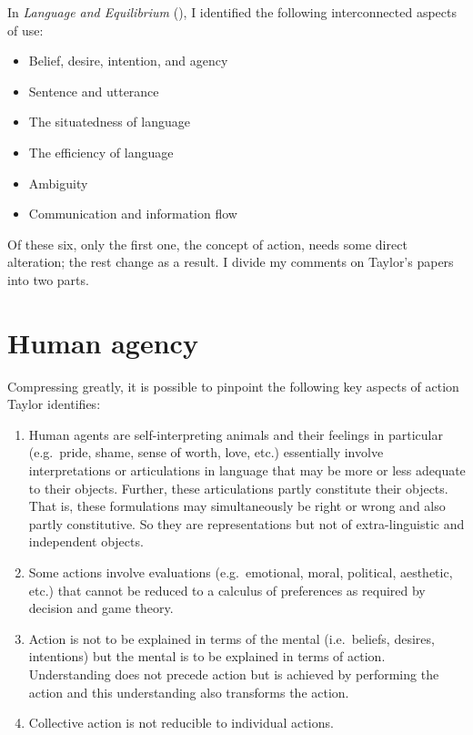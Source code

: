 In \emph{Language and Equilibrium} (\citeyear[Section~1.4.2]{parikh:le}), I identified the following interconnected aspects of use:

\begin{itemize}
\item Belief, desire, intention, and agency
\item Sentence and utterance
\item The situatedness of language
\item The efficiency of language
\item Ambiguity
\item Communication and information flow
\end{itemize}

Of these six, only the first one, the concept of action, needs some direct alteration; the rest change as a result. I divide my comments on Taylor's papers into two parts.


\section{Human agency} \label{sec:human agency}

Compressing greatly, it is possible to pinpoint the following key aspects of action Taylor identifies:


\begin{enumerate}

\item Human agents are self-interpreting animals and their feelings in particular (e.g.\ pride, shame, sense of worth, love, etc.) essentially involve interpretations or articulations in language that may be more or less adequate to their objects. Further, these articulations partly constitute their objects. That is, these formulations may simultaneously be right or wrong and also partly constitutive. So they are representations but not of extra-linguistic and independent objects. \citep{taylor:sia, taylor:cp}

\item Some actions involve evaluations (e.g.\ emotional, moral, political, aesthetic, etc.) that cannot be reduced to a calculus of preferences as required by decision and game theory. \citep{taylor:wha}

\item Action is not to be explained in terms of the mental (i.e.\ beliefs, desires, intentions) but the mental is to be explained in terms of action. Understanding does not precede action but is achieved by performing the action and this understanding also transforms the action. \citep{taylor:hpm}

\item Collective action is not reducible to individual actions. \citep{taylor:hpm}


\end{enumerate}


